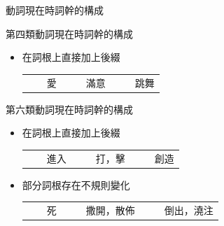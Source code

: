 \documentclass[aspectratio=169]{beamer}
\begin{document}
\begin{frame}{動詞現在時詞幹的構成}
    \small
    \begin{block}{第四類動詞現在時詞幹的構成}
        \begin{itemize}

        \item 在詞根上直接加上後綴\\
            \begin{tabular}{V}
                 &  & 愛 &
                 &  & 滿意 &
                 &  & 跳舞 \\
            \end{tabular}
        \end{itemize}
    \end{block}

    \begin{block}{第六類動詞現在時詞幹的構成}
        \begin{itemize}
            \item 在詞根上直接加上後綴 \\
            \begin{tabular}{V}
                 &  & 進入 &
                 &  & 打，擊 &
                 &  & 創造 \\
            \end{tabular}
            \item 部分詞根存在不規則變化 \\
            \begin{tabular}{V}
                 &  & 死 &
                 &  & 撒開，散佈 &
                 &  & 倒出，澆注 \\
            \end{tabular}
        \end{itemize}
    \end{block}
\end{frame}
\end{document}
